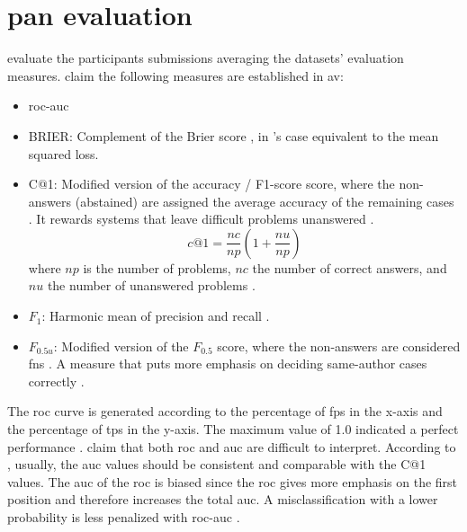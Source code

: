 \section{\acs{pan} evaluation}
\label{sec:pan_evaluation}

\citet{ayele_overview_2024,bevendorff_overview_2024} evaluate the participants submissions averaging the datasets' evaluation measures.
\citet{ayele_overview_2024} claim the following measures are established in \ac{av}:
\begin{itemize}
    \item \ac{roc-auc} \cite{bevendorff_overview_2024,weerasinghe_feature_vector_difference_2021,kocher_unine_2015}
    \item BRIER: Complement of the Brier score \cite{bevendorff_overview_2024,weerasinghe_feature_vector_difference_2021}, in \citet{bevendorff_overview_2024}'s case equivalent to the mean squared loss.
    \item C@1: Modified version of the accuracy \cite{bevendorff_overview_2024}/ F1-score \cite{weerasinghe_feature_vector_difference_2021} score, 
    where the non-answers (abstained) are assigned the average accuracy of the remaining cases \cite{bevendorff_overview_2024}. 
    It rewards systems that leave difficult problems unanswered \cite{weerasinghe_feature_vector_difference_2021}.
    $$c@1 = \frac{nc}{np}(1+\frac{nu}{np})$$ where $np$ is the number of problems, $nc$ the number of correct answers, 
    and $nu$ the number of unanswered problems \cite{kocher_unine_2015}.
    \item $F_1$: Harmonic mean of precision and recall \cite{bevendorff_overview_2024,weerasinghe_feature_vector_difference_2021}.
    \item $F_{0.5u}$: Modified version of the $F_{0.5}$ score, where the non-answers are considered \acp{fn} \cite{bevendorff_overview_2024}. A measure that puts more emphasis on deciding same-author cases correctly \cite{weerasinghe_feature_vector_difference_2021}.
\end{itemize}

The \ac{roc} curve is generated according to the percentage of \acp{fp} in the x-axis and the percentage of \acp{tp} in the y-axis.
The maximum value of 1.0 indicated a perfect performance \cite{kocher_unine_2015}.
\citet{kocher_unine_2015} claim that both \ac{roc} and \ac{auc} are difficult to interpret.
According to \citet{kocher_unine_2015}, usually, the \ac{auc} values should be consistent and comparable with the C@1 values.
The \ac{auc} of the \ac{roc} is biased since the \ac{roc} gives more emphasis 
on the first position and therefore increases the total \ac{auc}.
A misclassification with a lower probability is less penalized with \ac{roc-auc} \cite{kocher_unine_2015}.